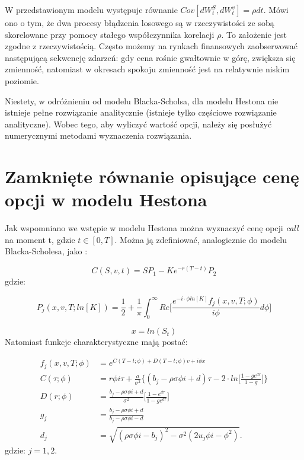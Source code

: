 \documentclass{pracamgr}
\begin{document}
W przedstawionym modelu występuje równanie $Cov[dW^S_t, dW^v_t] = \rho dt $. Mówi ono o tym, że 
dwa procesy błądzenia losowego są w rzeczywistości ze sobą skorelowane przy pomocy stałego współczynnika 
korelacji $\rho$.
To założenie jest zgodne z rzeczywistością. Często możemy na rynkach finansowych zaobserwować następującą sekwencję zdarzeń: gdy cena rośnie gwałtownie w górę, zwiększa się zmienność, 
natomiast w okresach spokoju zmienność jest na relatywnie niskim poziomie.

Niestety, w odróżnieniu od modelu Blacka-Scholsa, dla modelu Hestona nie istnieje pełne rozwiązanie analitycznie (istnieje tylko częściowe rozwiązanie analityczne). Wobec tego, aby 
wyliczyć wartość opcji, należy się posłużyć numerycznymi metodami wyznaczenia rozwiązania.


\section{Zamknięte równanie opisujące cenę opcji w modelu Hestona}



Jak wspomniano we wstępie w modelu Hestona można wyznaczyć cenę opcji \textit{call} na moment t, gdzie $t \in [0, T]$. Można ją zdefiniować, analogicznie do modelu Blacka-Scholesa, jako  \cite{Heston}:

\begin{equation}
  C(S, v, t) = SP_1 -K e^{-r(T-t)} P_2
\end{equation}
gdzie:

\begin{equation}
\label{eq:HestonProb}
  P_j (x, v, T; ln[K]) = \frac{1}{2} + \frac{1}{\pi} \int_{0}^{\infty} Re \bigg[ \frac{e^{-i \cdot \phi ln[K]} f_j(x, v, T; \phi) }{i \phi} d \phi \bigg]
\end{equation}

\begin{equation}
  x = ln(S_t)
\end{equation}
Natomiast funkcje charakterystyczne mają postać: 

\begin{equation}
\label{eq:HestonCharacteristic}
  \begin{aligned}
f_j(x, v, T; \phi) &= e^{C(T-t; \phi) + D(T-t; \phi)v + i \phi x} \\
C (\tau; \phi)     &= r \phi i \tau + \frac{a}{\sigma^2} \bigg\{ (b_j - \rho \sigma \phi i + d) \tau - 2 \cdot ln \bigg[ \frac{1 - ge^{dr}}{1-g} \bigg] \bigg\} \\
D (r; \phi)        &= \frac{b_j- \rho \sigma \phi i + d}{\sigma^2} \bigg[ \frac{1 - e^{d\tau}}{1 - ge^{d\tau}} \bigg]   \\
g_j                &= \frac{b_j - \rho \sigma \phi i + d}{b_j - \rho \sigma \phi i - d} \\
d_j                &= \sqrt{(\rho \sigma \phi i  - b_j)^2 - \sigma^2(2 u_j \phi  i  - \phi^2)}.
  \end{aligned}
\end{equation}
gdzie: $j = 1,2$.
\end{document}
